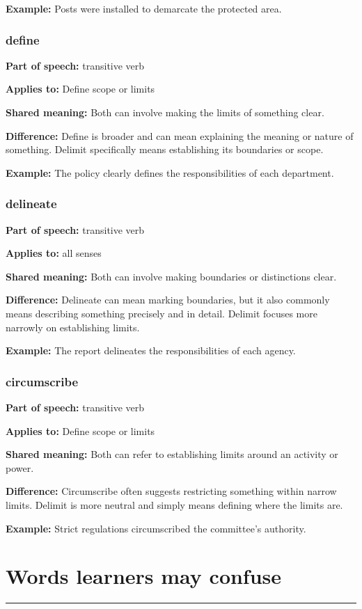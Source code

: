 \documentclass[11pt]{article}
\newcommand{\sectionrule}{\par\vspace{-0.5em}\noindent\textcolor{Accent}{\rule{\linewidth}{0.6pt}}\par}
\begin{document}
\textbf{Example:} Posts were installed to demarcate the protected area.

\subsubsection{define}
\textbf{Part of speech:} transitive verb

\textbf{Applies to:} Define scope or limits

\textbf{Shared meaning:} Both can involve making the limits of something clear.

\textbf{Difference:} Define is broader and can mean explaining the meaning or nature of something. Delimit specifically means establishing its boundaries or scope.

\textbf{Example:} The policy clearly defines the responsibilities of each department.

\subsubsection{delineate}
\textbf{Part of speech:} transitive verb

\textbf{Applies to:} all senses

\textbf{Shared meaning:} Both can involve making boundaries or distinctions clear.

\textbf{Difference:} Delineate can mean marking boundaries, but it also commonly means describing something precisely and in detail. Delimit focuses more narrowly on establishing limits.

\textbf{Example:} The report delineates the responsibilities of each agency.

\subsubsection{circumscribe}
\textbf{Part of speech:} transitive verb

\textbf{Applies to:} Define scope or limits

\textbf{Shared meaning:} Both can refer to establishing limits around an activity or power.

\textbf{Difference:} Circumscribe often suggests restricting something within narrow limits. Delimit is more neutral and simply means defining where the limits are.

\textbf{Example:} Strict regulations circumscribed the committee's authority.

\section{Words learners may confuse}
\sectionrule
\end{document}
